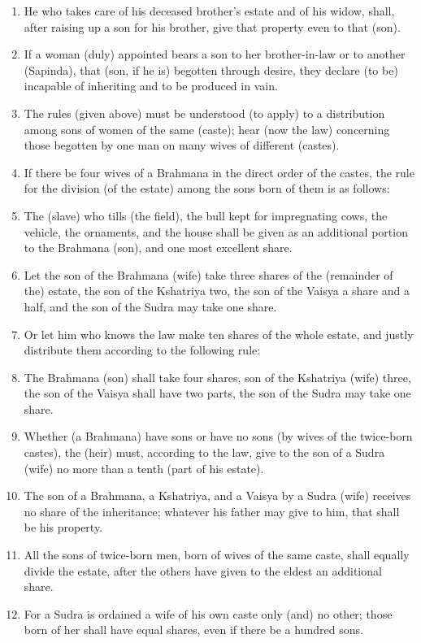 \begin{enumerate}
\item He who takes care of his deceased brother's estate and of his widow, shall, after raising up a son for his brother, give that property even to that (son).
\item If a woman (duly) appointed bears a son to her brother-in-law or to another (Sapinda), that (son, if he is) begotten through desire, they declare (to be) incapable of inheriting and to be produced in vain.
\item The rules (given above) must be understood (to apply) to a distribution among sons of women of the same (caste); hear (now the law) concerning those begotten by one man on many wives of different (castes).
\item If there be four wives of a Brahmana in the direct order of the castes, the rule for the division (of the estate) among the sons born of them is as follows:
\item The (slave) who tills (the field), the bull kept for impregnating cows, the vehicle, the ornaments, and the house shall be given as an additional portion to the Brahmana (son), and one most excellent share.
\item Let the son of the Brahmana (wife) take three shares of the (remainder of the) estate, the son of the Kshatriya two, the son of the Vaisya a share and a half, and the son of the Sudra may take one share.
\item Or let him who knows the law make ten shares of the whole estate, and justly distribute them according to the following rule:
\item The Brahmana (son) shall take four shares, son of the Kshatriya (wife) three, the son of the Vaisya shall have two parts, the son of the Sudra may take one share.
\item Whether (a Brahmana) have sons or have no sons (by wives of the twice-born castes), the (heir) must, according to the law, give to the son of a Sudra (wife) no more than a tenth (part of his estate).
\item The son of a Brahmana, a Kshatriya, and a Vaisya by a Sudra (wife) receives no share of the inheritance; whatever his father may give to him, that shall be his property.
\item All the sons of twice-born men, born of wives of the same caste, shall equally divide the estate, after the others have given to the eldest an additional share.
\item For a Sudra is ordained a wife of his own caste only (and) no other; those born of her shall have equal shares, even if there be a hundred sons.

\end{enumerate}
